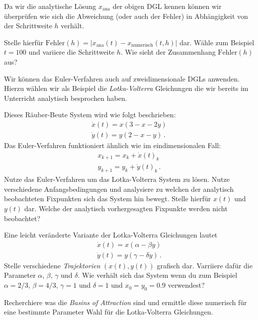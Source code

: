 \subexercise[%
  topic={Zusatz: Fehlerabsch\"atzung des Euler Verfahren},
    ]

Da wir die analytische L\"osung $x_{\mathrm{ana}}$ der obigen DGL kennen k\"onnen wir \"uberpr\"ufen wie sich die Abweichung (oder auch der Fehler) in Abh\"angigkeit von der Schrittweite $h$ verh\"alt.

Stelle hierf\"ur $\mathrm{Fehler}(h)=|x_{\mathrm{ana}}(t) - x_{\mathrm{numerisch}}(t,h)|$ dar. W\"ahle zum Beispiel $t=100$ und variiere die Schrittweite $h$. Wie sieht der Zusammenhang $\mathrm{Fehler}(h)$ aus?

 \subexercise[%
  topic={Numerische L\"osung der Lotka-Volterra Gleichungen},
    ]

Wir k\"onnen das Euler-Verfahren auch auf zweidimensionale DGLs anwenden. Hierzu w\"ahlen wir als Beispiel die \emph{Lotka-Volterra} Gleichungen die wir bereits im Unterricht analytisch besprochen haben.

Dieses R\"auber-Beute System wird wie folgt beschrieben:
\begin{align}
\dot x(t) = x(3-x-2y)\\
\dot y(t) = y(2-x-y)\,.
\end{align}
Das Euler-Verfahren funktioniert \"ahnlich wie im eindimensionalen Fall:
\begin{align}
x_{k+1} = x_{k} + \dot x(t)_{k} \\
y_{k+1} = y_{k} + \dot y(t)_{k}\,.
\end{align}
Nutze das Euler-Verfahren um das Lotka-Volterra System zu l\"osen. Nutze verschiedene Anfangsbedingungen und analysiere zu welchen der analytisch beobachteten Fixpunkten sich das System hin bewegt. Stelle hierf\"ur $x(t)$ und $y(t)$ dar. Welche der analytisch vorhergesagten Fixpunkte werden nicht beobachtet?

\subexercise[%
  topic={Zusatz: Oszillationen im Lotka-Volterra System},
    ]
Eine leicht ver\"anderte Variante der Lotka-Volterra Gleichungen lautet
\begin{align}
\dot x(t) = x(\alpha -\beta y)\\
\dot y(t) = y(\gamma -\delta y)\,.
\end{align}
Stelle verschiedene \emph{Trajektorien} $(x(t),y(t))$ grafisch dar. Varriiere daf\"ur die Parameter $\alpha$, $\beta$, $\gamma$ und $\delta$. Wie verh\"alt sich das System wenn du zum Beispiel $\alpha=2/3$, $\beta=4/3$, $\gamma=1$ und $\delta=1$ und $x_0=y_0=0.9$ verwendest?

\subexercise[%
  topic={Zusatz: \emph{Basins of Attraction} Lotka-Volterra System},
    ]
Recherchiere was die \emph{Basins of Attraction} sind und ermittle diese numerisch f\"ur eine bestimmte Parameter Wahl f\"ur die Lotka-Volterra Gleichungen.
